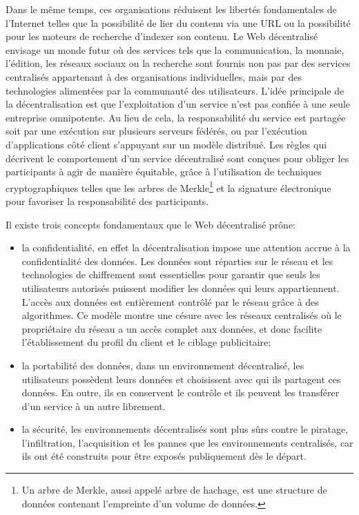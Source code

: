 \documentclass{tnreport}
\begin{document}
Dans le même temps, ces organisations réduisent les libertés fondamentales de l'Internet telles que la possibilité de lier du contenu via une URL ou la possibilité pour les moteurs de recherche d'indexer son contenu.
Le Web décentralisé envisage un monde futur où des services tels que la communication, la monnaie, l'édition, les réseaux sociaux ou la recherche sont fournis non pas par des services centralisés appartenant à des organisations individuelles, mais par des technologies alimentées par la communauté des utilisateurs.
L'idée principale de la décentralisation est que l'exploitation d'un service n'est pas confiée à une seule entreprise omnipotente. Au lieu de cela, la responsabilité du service est partagée soit par une exécution sur plusieurs serveurs fédérés, ou par l'exécution d'applications côté client s'appuyant sur un modèle distribué.
Les règles qui décrivent le comportement d'un service décentralisé sont conçues pour obliger les participants à agir de manière équitable, grâce à l'utilisation de techniques cryptographiques telles que les arbres de Merkle\footnote{Un arbre de Merkle, aussi appelé arbre de hachage, est une structure de données contenant l'empreinte d'un volume de données.} et la signature électronique pour favoriser la responsabilité des participants.

Il existe trois concepts fondamentaux que le Web décentralisé prône:
\begin{itemize}
	\item la confidentialité, en effet la décentralisation impose une attention accrue à la confidentialité des données. Les données sont réparties sur le réseau et les technologies de chiffrement sont essentielles pour garantir que seuls les utilisateurs autorisés puissent modifier les données qui leurs appartiennent. L'accès aux données est entièrement contrôlé par le réseau grâce à des algorithmes. Ce modèle montre une césure avec les réseaux centralisés où le propriétaire du réseau a un accès complet aux données, et donc facilite l'établissement du profil du client et le ciblage publicitaire;
	\item la portabilité des données, dans un environnement décentralisé, les utilisateurs possèdent leurs données et choisissent avec qui ils partagent ces données. En outre, ils en conservent le contrôle et ils peuvent les transférer d'un service à un autre librement.
	\item la sécurité, les environnements décentralisés sont plus sûrs contre le piratage, l'infiltration, l'acquisition et les pannes que les environnements centralisés, car ils ont été construits pour être exposés publiquement dès le départ.
	\newline
\end{itemize}
\end{document}
